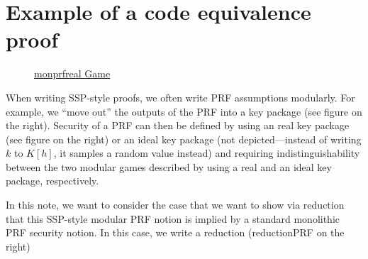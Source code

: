 \documentclass[a4paper]{article}
\begin{document}
\vspace{-5cm}

\section{Example of a code equivalence proof}

\begin{figure}
\vspace{-0.7cm}
\begin{pcvstack}
\underline{\underline{monprfreal Game}}\\
\scalebox{0.8}{
}
\pcvspace
\begin{pchstack}


\end{pchstack}
\end{pcvstack}
\vspace{-0.5cm}
\end{figure}


When writing SSP-style proofs, we often write PRF assumptions modularly. For example, we ``move out'' the outputs of the PRF into a key package (see figure on the right). Security of a PRF can then be defined by using an real key package (see figure on the right) or an ideal key package (not depicted---instead of writing $k$ to $K[h]$, it samples a random value instead) and requiring indistinguishability between the two modular games described by using a real and an ideal key package, respectively.


In this note, we want to consider the case that we want to show via reduction that this SSP-style modular PRF notion is implied by a standard monolithic PRF security notion. In this case, we write a reduction (reductionPRF on the right) 
\end{document}
